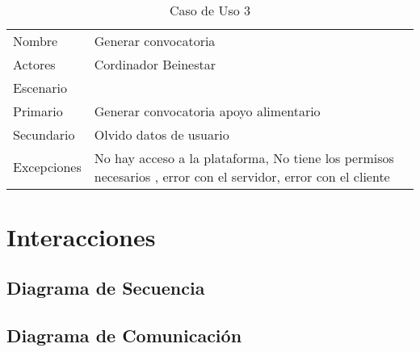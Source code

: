 \\


\begin{table}[]
\centering
\caption{Caso de Uso 3}
\label{my-label}
\begin{tabular}{ll}
\cellcolor[HTML]{FFCB2F}Nombre & Generar convocatoria                                                                                           \\
Actores                        & Cordinador Beinestar                                                                                           \\
Escenario                      &                                                                                                                \\
Primario                       & Generar convocatoria apoyo alimentario                                                                         \\
Secundario                     & Olvido datos de usuario                                                                                        \\
Excepciones                    & No hay acceso a la plataforma, No tiene los permisos necesarios  , error con el servidor, error con el cliente
\end{tabular}
\end{table}




\newpage

\section{Interacciones}

\newpage

\subsection{Diagrama de Secuencia}

\newpage

\subsection{Diagrama de Comunicación}

\newpage

